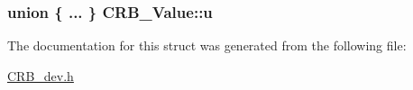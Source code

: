 \subsubsection[{u}]{\setlength{\rightskip}{0pt plus 5cm}union \{ ... \}   C\+R\+B\+\_\+\+Value\+::u}\label{struct_c_r_b___value_aac6984702013a49c5f0e75e84cfc5bdd}


The documentation for this struct was generated from the following file\+:\begin{DoxyCompactItemize}
\item 
\hyperlink{_c_r_b__dev_8h}{C\+R\+B\+\_\+dev.\+h}\end{DoxyCompactItemize}
